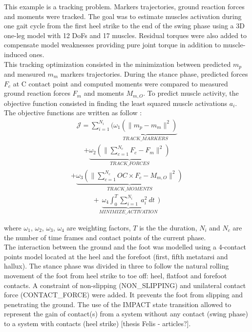 This example is a tracking problem. 
Markers trajectories, ground reaction forces and moments were tracked. 
The goal was to estimate muscles activation during one gait cycle from the first heel strike to the end of the swing phase using a 3D one-leg model with 12 DoFs and 17 muscles. 
Residual torques were also added to compensate model weaknesses providing pure joint torque in addition to muscle-induced ones.\\

This tracking optimization consisted in the minimization between predicted $m_p$ and measured $m_m$ markers trajectories. 
During the stance phase, predicted forces $F_c$ at C contact point and computed moments 
were compared to measured ground reaction forces $F_m$ and moments $M_{m,O}$.
To predict muscle activity, the objective function consisted in finding the least squared muscle activations $a_{i}$. 
The objective functions are written as follow :\\


\begin{eqnarray}
\label{eq:ocp_q}
\mathcal{J} = \sum_{i=1}^{N_i}\Bigg(\underbrace{\omega_1(\|m_p - m_m\|^{2})}_{TRACK\_MARKERS}
\label{eq:ocp_forces}
\end{eqnarray}
\begin{eqnarray}
+ \underbrace{\omega_2(\|\sum_{c=1}^{N_c}F_c - F_m\|^{2})}_{TRACK\_FORCES}
\end{eqnarray}
\begin{eqnarray}
\label{eq:ocp_moments}
+ \underbrace{\omega_3(\|\sum_{c=1}^{N_c}OC\times F_c - M_{m,O}\|^{2})}_{TRACK\_MOMENTS}
\end{eqnarray}
\begin{eqnarray}
\label{eq:ocp_muscles}
+ \underbrace{\omega_4\int_0^T \sum_{i=1}^{N_i}~a_{i}^2~dt}_{MINIMIZE\_ ACTIVATION}\bigg)  
\end{eqnarray}

where $\omega_1$, $\omega_2$, $\omega_3$, $\omega_4$ are weighting factors, $T$ is the the duration, $N_i$ and $N_c$ are the number of time frames and contact points of the current phase. \\


The interaction between the ground and the foot was modelled using a 4-contact points model located at the heel and the forefoot (first, fifth metatarsi and hallux). 
The stance phase was divided in three to follow the natural rolling movement of the foot from heel strike to toe off: heel, flatfoot and forefoot contacts. 
A constraint of non-slipping (NON\_SLIPPING) and unilateral contact force (CONTACT\_FORCE) were added. 
It prevents the foot from slipping and penetrating the ground. 
The use of the IMPACT state transition allowed to represent the gain of contact(s) from a system without any contact (swing phase) to a system with contacts (heel strike) [thesis Felis - articles?].  \\

